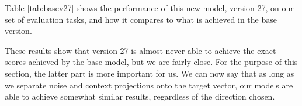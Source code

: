Table \ref{tab:basev27} shows the performance of this new model, version 27, on our set of evaluation tasks, and how it compares to what is achieved in the base version.

These results show that version 27 is almost never able to achieve the exact scores achieved by the base model, but we are fairly close. For the purpose of this section, the latter part is more important for us. We can now say that as long as we separate noise and context projections onto the target vector, our models are able to achieve somewhat similar results, regardless of the direction chosen.




